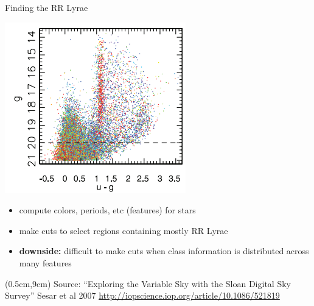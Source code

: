 \documentclass[12pt]{beamer}
\newcommand{\att}[1]{\begin{textblock*}{12cm}(0.5cm,9cm) %
  {\tiny Source: #1}
      \end{textblock*}}
\begin{document}
\begin{frame}{Finding the RR Lyrae}

\vspace{-.1in}
  
  \begin{center}
    \includegraphics[scale=0.5]{figs/rr_color.png}
    \end{center}

\vspace{-.1in}
  
  \begin{itemize}
  \item compute colors, periods, etc (features) for stars
  \item make cuts to select regions containing mostly RR Lyrae
  \item \textbf{downside:} difficult to make cuts when class information is distributed across many features
  \end{itemize}
  
\att{``Exploring the Variable Sky with the Sloan Digital Sky Survey'' Sesar et al 2007 \url{http://iopscience.iop.org/article/10.1086/521819}\\}
  
\end{frame}
\end{document}
